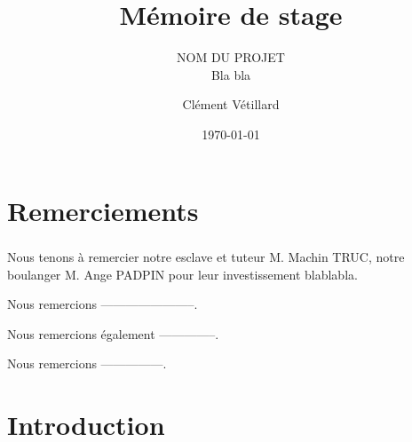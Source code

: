 \documentclass[a4paper, 12pt]{scrreprt}
\title{
	\Huge \bfseries Mémoire de stage
}
\subtitle{
	NOM DU PROJET
	\hfill\\
	{\normalfont Bla bla}
}
\author{
	\small
	Clément Vétillard
}
\date{\today}
\begin{document}
	\maketitle

	\tableofcontents
	
	\chapter*{Remerciements}
		\paragraph{}
			Nous tenons à remercier notre esclave et tuteur M. Machin TRUC, notre boulanger M. Ange PADPIN pour leur investissement blablabla.
			
			
			Nous remercions -----------------------.
			
			Nous remercions également --------------.
			
			Nous remercions ---------------. 
		
	\clearpage
	
	\chapter*{Introduction}
\end{document}
